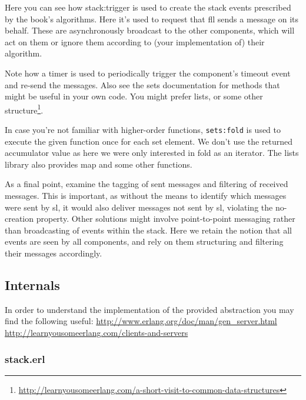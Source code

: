 \documentclass[a4paper]{article}
\begin{document}
Here you can see how stack:trigger is used to create the stack events
prescribed by the book's algorithms. Here it's used to request that fll sends
a message on its behalf. These are asynchronously broadcast to the other components,
which will act on them or ignore them according to (your implementation of)
their algorithm.

Note how a timer is used to periodically trigger the component's timeout event
and re-send the messages. Also see the sets documentation for methods that
might be useful in your own code. You might prefer lists, or some other
structure\footnote{\url{http://learnyousomeerlang.com/a-short-visit-to-common-data-structures}}.

In case you're not familiar with higher-order functions, \lstinline!sets:fold!
is used to execute the given function once for each set element. We don't use
the returned accumulator value as here we were only interested in fold as an
iterator. The lists library also provides map and some other functions.

As a final point, examine the tagging of sent messages and filtering of
received messages. This is important, as without the means to identify which
messages were sent by sl, it would also deliver messages not sent by sl,
violating the no-creation property. Other solutions might involve
point-to-point messaging rather than broadcasting of events within the stack.
Here we retain the notion that all events are seen by all components, and
rely on them structuring and filtering their messages accordingly.





\subsection{Internals} %
\label{sub:internals}

In order to understand the implementation of the provided abstraction you
may find the following useful:
\url{http://www.erlang.org/doc/man/gen_server.html}\\
\url{http://learnyousomeerlang.com/clients-and-servers}

\subsubsection{stack.erl} %
\label{sub:stack_erl}
\end{document}
